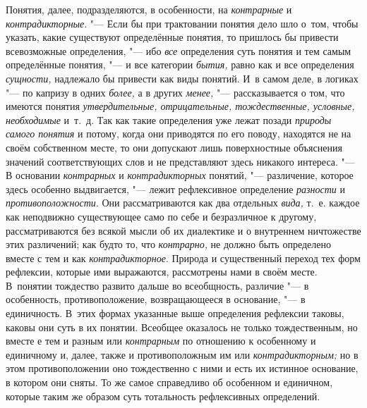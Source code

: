 Понятия, далее, подразделяются, в особенности, на {\em контрарные} и
{\em контрадикторные}. "--- Если бы при трактовании понятия дело шло о~том,
чтобы указать, какие существуют определённые понятия, то пришлось бы привести
всевозможные определения, "--- ибо {\em все} определения суть понятия и тем
самым определённые понятия, "--- и все категории {\em бытия,} равно как и все
определения {\em сущности,} надлежало бы привести как виды понятий. И~в самом
деле, в логиках "--- по капризу в одних {\em более,} а в других {\em менее,}
"--- рассказывается о том, что имеются понятия {\em утвердительные,
отрицательные, тождественные, условные, необходимые} и~т.~д. Так как такие
определения уже лежат позади {\em природы самого понятия} и потому, когда они
приводятся по его поводу, находятся не на своём собственном месте, то они
допускают лишь поверхностные объяснения значений соответствующих слов и не
представляют здесь никакого интереса. "--- В основании {\em контрарных} и {\em
контрадикторных} понятий, "--- различение, которое здесь особенно выдвигается,
"--- лежит рефлексивное определение {\em разности} и {\em противоположности}.
Они рассматриваются как два отдельных {\em вида,} т.~е. каждое как неподвижно
существующее само по себе и безразличное к другому, рассматриваются без всякой
мысли об их диалектике и о внутреннем ничтожестве этих различений; как будто то,
что {\em контрарно,} не должно быть определено вместе с тем и как {\em
контрадикторное}. Природа и существенный переход тех форм рефлексии, которые
ими выражаются, рассмотрены нами в своём месте. В~понятии тождество развито
дальше во всеобщность, различие "--- в особенность, противоположение,
возвращающееся в основание, "--- в единичность. В~этих формах указанные выше
определения рефлексии таковы, каковы они суть в их понятии. Всеобщее оказалось
не только тождественным, но вместе е тем и разным или {\em контрарным} по
отношению к особенному и единичному и, далее, также и противоположным им или
{\em контрадикторным;} но в этом противоположении оно тождественно с ними и
есть их истинное основание, в котором они сняты. То же самое
справедливо об особенном и единичном, которые таким же
образом суть тотальность рефлексивных определений.

